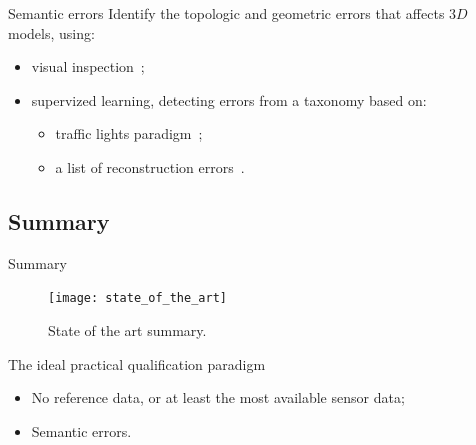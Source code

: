 \documentclass{beamer}
\begin{document}
            \begin{frame}{Semantic errors}
                Identify the topologic and geometric errors that affects $3D$ models, using:
                \begin{itemize}[label=$\blacktriangleright$, font=\color{IGNGreen}]
                    \item<1-> visual inspection~\citep{OudeElberink2010};
                    \item<2-> supervized learning, detecting errors from a taxonomy based on:
                    \begin{itemize}[label=--]
                        \item<3-> traffic lights paradigm~\citep{boudet2006supervised};
                        \item<4-> a list of reconstruction errors~\citep{Michelin2013}.
                    \end{itemize}
                \end{itemize}
            \end{frame}
        \subsection{Summary}
            \begin{frame}[plain]{Summary}
                \begin{figure}
                    \texttt{[image: state\_of\_the\_art]}
                    \caption{\label{fig::bib_summary} State of the art summary.}
                \end{figure}
            \end{frame}
            \begin{frame}{The ideal practical qualification paradigm}
                \begin{itemize}[label=$\blacktriangleright$, font=\color{IGNGreen}, itemsep=2em]
                    \item<1-> No reference data, or at least the most available sensor data;
                    \item<2-> Semantic errors.
                \end{itemize}
            \end{frame}
\end{document}
